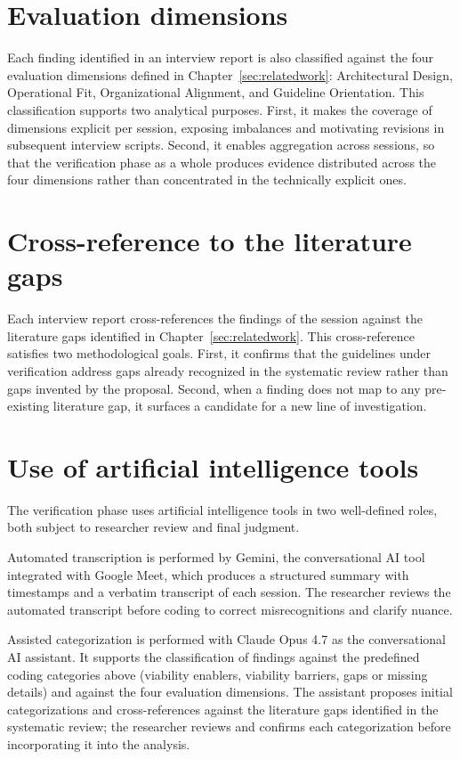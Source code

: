 \section*{Evaluation dimensions}

Each finding identified in an interview report is also classified against the four evaluation dimensions defined in Chapter~\ref{sec:relatedwork}: Architectural Design, Operational Fit, Organizational Alignment, and Guideline Orientation. This classification supports two analytical purposes. First, it makes the coverage of dimensions explicit per session, exposing imbalances and motivating revisions in subsequent interview scripts. Second, it enables aggregation across sessions, so that the verification phase as a whole produces evidence distributed across the four dimensions rather than concentrated in the technically explicit ones.

\section*{Cross-reference to the literature gaps}

Each interview report cross-references the findings of the session against the literature gaps identified in Chapter~\ref{sec:relatedwork}. This cross-reference satisfies two methodological goals. First, it confirms that the guidelines under verification address gaps already recognized in the systematic review rather than gaps invented by the proposal. Second, when a finding does not map to any pre-existing literature gap, it surfaces a candidate for a new line of investigation.

\section*{Use of artificial intelligence tools}
\label{sec:ai-use}

The verification phase uses artificial intelligence tools in two well-defined roles, both subject to researcher review and final judgment.

Automated transcription is performed by Gemini, the conversational AI tool integrated with Google Meet, which produces a structured summary with timestamps and a verbatim transcript of each session. The researcher reviews the automated transcript before coding to correct misrecognitions and clarify nuance.

Assisted categorization is performed with Claude Opus 4.7 as the conversational AI assistant. It supports the classification of findings against the predefined coding categories above (viability enablers, viability barriers, gaps or missing details) and against the four evaluation dimensions. The assistant proposes initial categorizations and cross-references against the literature gaps identified in the systematic review; the researcher reviews and confirms each categorization before incorporating it into the analysis.

